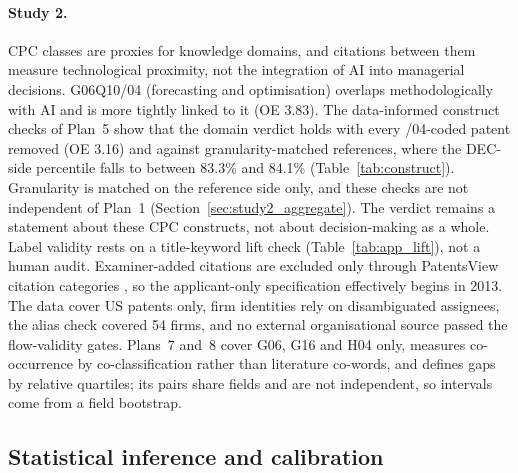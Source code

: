 \paragraph{Study 2.} CPC classes are proxies for knowledge domains, and citations between them measure technological proximity, not the integration of AI into managerial decisions. G06Q10/04 (forecasting and optimisation) overlaps methodologically with AI and is more tightly linked to it (OE 3.83). The data-informed construct checks of Plan~5 show that the domain verdict holds with every /04-coded patent removed (OE 3.16) and against granularity-matched references, where the DEC-side percentile falls to between 83.3\% and 84.1\% (Table~\ref{tab:construct}). Granularity is matched on the reference side only, and these checks are not independent of Plan~1 (Section~\ref{sec:study2_aggregate}). The verdict remains a statement about these CPC constructs, not about decision-making as a whole. Label validity rests on a title-keyword lift check (Table~\ref{tab:app_lift}), not a human audit. Examiner-added citations are excluded only through PatentsView citation categories \citep{alcacer2006patent,uspto2026patentsview}, so the applicant-only specification effectively begins in 2013. The data cover US patents only, firm identities rely on disambiguated assignees, the alias check covered 54 firms, and no external organisational source passed the flow-validity gates. Plans~7 and~8 cover G06, G16 and H04 only, measures co-occurrence by co-classification rather than literature co-words, and defines gaps by relative quartiles; its pairs share fields and are not independent, so intervals come from a field bootstrap.

\subsection{Statistical inference and calibration}
\label{sec:lim_inference}

